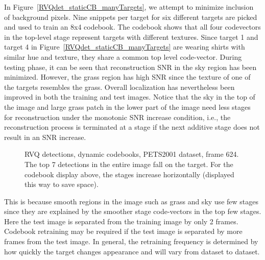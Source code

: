 In Figure~\ref{RVQdet_staticCB_manyTargets}, we attempt to minimize inclusion of background pixels.  Nine snippets per target for six different targets are picked and used to train an 8x4 codebook.  The codebook shows that all four codevectors in the top-level stage represent targets with different textures.  Since target 1 and target 4 in Figure~\ref{RVQdet_staticCB_manyTargets} are wearing shirts with similar hue and texture, they share a common top level code-vector.   During testing phase, it can be seen that reconstruction SNR in the sky region has been minimized.  However, the grass region has high SNR since the texture of one of the targets resembles the grass.  Overall localization has nevertheless been improved in both the training and test images.  Notice that the sky in the top of the image and large grass patch in the lower part of the image need less stages for reconstruction under the monotonic SNR increase condition, i.e., the reconstruction process is terminated at a stage if the next additive stage does not result in an SNR increase.  
								\begin{figure}[t]
								\centering	
								\caption{RVQ detections, dynamic codebooks, PETS2001 dataset, frame 624.  The top 7 detections in the entire image fall on the target.  For the codebook display above, the stages increase horizontally (displayed this way to save space).}										
								\label{RVQtrk_dynamicCB_manyTargets}				
								\end{figure}
This is because smooth regions in the image such as grass and sky use few stages since they are explained by the smoother stage code-vectors in the top few stages.  Here the test image is separated from the training image by only 2 frames.  Codebook retraining may be required if the test image is separated by more frames from the test image.  In general, the retraining frequency is determined by how quickly the target changes appearance and will vary from dataset to dataset.

